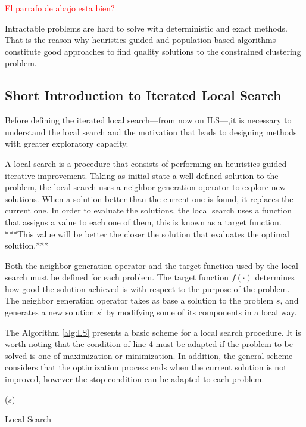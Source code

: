 \documentclass[review]{elsarticle}
\begin{document}
\textcolor{red}{El parrafo de abajo esta bien?}

Intractable problems are hard to solve with deterministic and exact methods. That is the reason why heuristics-guided and population-based algorithms constitute good approaches to find quality solutions to the constrained clustering problem.

\subsection{Short Introduction to Iterated Local Search}

Before defining the iterated local search---from now on ILS---,it is necessary to understand the local search and the motivation that leads to designing methods with greater exploratory capacity.

A local search is a procedure that consists of performing an heuristics-guided iterative improvement. Taking as initial state a well defined solution to the problem, the local search uses a neighbor generation operator to explore new solutions. When a solution better than the current one is found, it replaces the current one. In order to evaluate the solutions, the local search uses a function that assigns a value to each one of them, this is known as a target function. ***This value will be better the closer the solution that evaluates the optimal solution.*** 

Both the neighbor generation operator and the target function used by the local search must be defined for each problem. The target function $f(\cdot)$ determines how good the solution achieved is with respect to the purpose of the problem. The neighbor generation operator takes as base a solution to the problem $s$, and generates a new solution $s^\prime$ by modifying some of its components in a local way.

The Algorithm \ref{alg:LS} presents a basic scheme for a local search procedure. It is worth noting that the condition of line 4 must be adapted if the problem to be solved is one of maximization or minimization. In addition, the general scheme considers that the optimization process ends when the current solution is not improved, however the stop condition can be adapted to each problem.

\begin{algorithm}
	\SetNlSkip{0.5em}
	\BlankLine
	\BlankLine
	\KwRet ($s$)
	
	\caption{Local Search}\label{alg:LS}
\end{algorithm}
\end{document}
